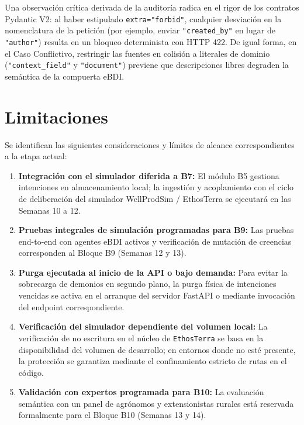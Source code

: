 \documentclass[11pt,a4paper]{article}
\begin{document}
Una observación crítica derivada de la auditoría radica en el rigor de los contratos Pydantic V2: al haber estipulado \texttt{extra="forbid"}, cualquier desviación en la nomenclatura de la petición (por ejemplo, enviar \texttt{"created\_by"} en lugar de \texttt{"author"}) resulta en un bloqueo determinista con HTTP 422. De igual forma, en el Caso Conflictivo, restringir las fuentes en colisión a literales de dominio (\texttt{"context\_field"} y \texttt{"document"}) previene que descripciones libres degraden la semántica de la compuerta eBDI.

\section{Limitaciones}

Se identifican las siguientes consideraciones y límites de alcance correspondientes a la etapa actual:
\begin{enumerate}[itemsep=2pt]
    \item \textbf{Integración con el simulador diferida a B7:} El módulo B5 gestiona intenciones en almacenamiento local; la ingestión y acoplamiento con el ciclo de deliberación del simulador WellProdSim / EthosTerra se ejecutará en las Semanas 10 a 12.
    \item \textbf{Pruebas integrales de simulación programadas para B9:} Las pruebas end-to-end con agentes eBDI activos y verificación de mutación de creencias corresponden al Bloque B9 (Semanas 12 y 13).
    \item \textbf{Purga ejecutada al inicio de la API o bajo demanda:} Para evitar la sobrecarga de demonios en segundo plano, la purga física de intenciones vencidas se activa en el arranque del servidor FastAPI o mediante invocación del endpoint correspondiente.
    \item \textbf{Verificación del simulador dependiente del volumen local:} La verificación de no escritura en el núcleo de \texttt{EthosTerra} se basa en la disponibilidad del volumen de desarrollo; en entornos donde no esté presente, la protección se garantiza mediante el confinamiento estricto de rutas en el código.
    \item \textbf{Validación con expertos programada para B10:} La evaluación semántica con un panel de agrónomos y extensionistas rurales está reservada formalmente para el Bloque B10 (Semanas 13 y 14).
\end{enumerate}
\end{document}
